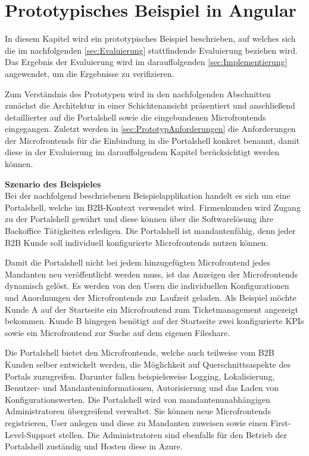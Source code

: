 \section{Prototypisches Beispiel in Angular}\label{sec:PrototypischesBeispiel}

In diesem Kapitel wird ein prototypisches Beispiel beschrieben, auf welches sich die im nachfolgenden \cref{sec:Evaluierung} stattfindende Evaluierung beziehen wird. Das Ergebnis der Evaluierung wird im darauffolgenden \cref{sec:Implementierung} angewendet, um die Ergebnisse zu verifizieren.

Zum Verständnis des Prototypen wird in den nachfolgenden Abschnitten zunächst die Architektur in einer Schichtenansicht präsentiert und anschließend detaillierter auf die Portalshell sowie die eingebundenen Microfrontends eingegangen. Zuletzt werden in \cref{sec:PrototypAnforderungen} die Anforderungen der Microfrontends für die Einbindung in die Portalshell konkret benannt, damit diese in der Evaluierung im darauffolgendem Kapitel berücksichtigt werden können.

\textbf{Szenario des Beispieles}\\
Bei der nachfolgend beschriebenen Beispielapplikation handelt es sich um eine Portalshell, welche im \gls{B2B}-Kontext verwendet wird. Firmenkunden wird Zugang zu der Portalshell gewährt und diese können über die Softwarelösung ihre Backoffice Tätigkeiten erledigen. Die Portalshell ist mandantenfähig, denn jeder \gls{B2B} Kunde soll individuell konfigurierte Microfrontends nutzen können. 

Damit die Portalshell nicht bei jedem hinzugefügten Microfrontend jedes Mandanten neu veröffentlicht werden muss, ist das Anzeigen der Microfrontends dynamisch gelöst. Es werden von den Usern die individuellen Konfigurationen und Anordnungen der Microfrontends zur Laufzeit geladen. Als Beispiel möchte Kunde A auf der Startseite ein Microfrontend zum Ticketmanagement angezeigt bekommen. Kunde B hingegen benötigt auf der Startseite zwei konfigurierte \gls{KPI}s sowie ein Microfrontend zur Suche auf dem eigenen Fileshare.

Die Portalshell bietet den Microfrontends, welche auch teilweise vom \gls{B2B} Kunden selber entwickelt werden, die Möglichkeit auf Querschnittsaspekte des Portals zuzugreifen. Darunter fallen beispielsweise Logging, Lokalisierung, Benutzer- und Mandanteninformationen, Autorisierung und das Laden von Konfigurationswerten. Die Portalshell wird von mandantenunabhängigen Administratoren übergreifend verwaltet. Sie können neue Microfrontends registrieren, User anlegen und diese zu Mandanten zuweisen sowie einen First-Level-Support stellen. Die Administratoren sind ebenfalls für den Betrieb der Portalshell zuständig und Hosten diese in Azure.

